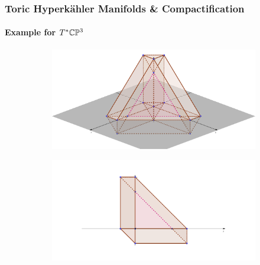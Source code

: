 \begin{frame}
	\frametitle{Toric Hyperk{\"a}hler Manifolds \& Compactification}
	\framesubtitle{Example for $T^{\ast}\mathbb{C}\mathbb{P}^{3}$}
	
	\begin{figure}
		\centering
		\begin{subfigure}{.5\textwidth}
			\centering
			\includegraphics[width=1.2\linewidth]{figures/Symplectic_Cut_Cotangent_CP3.png}
		\end{subfigure}%
		\begin{subfigure}{.5\textwidth}
			\centering
			\includegraphics[width=1.2\linewidth]{figures/Symplectic_Cut_Cotangent_CP3-side.png}
		\end{subfigure}
	\end{figure}
	
	
\end{frame}


